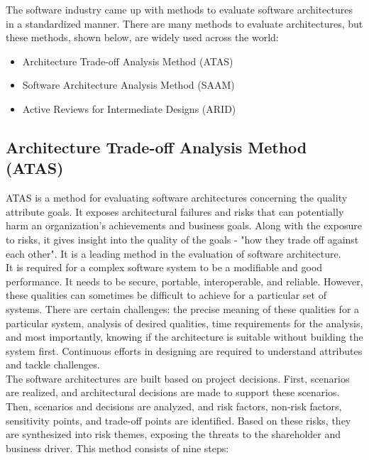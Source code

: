 \documentclass[12pt,a4paper]{article}
\begin{document}
{The software industry came up with methods to evaluate software architectures in a standardized manner. There are many methods to evaluate architectures, but these methods, shown below, are widely used across the world:

\begin{itemize}
\item Architecture Trade-off Analysis Method (ATAS)
\item Software Architecture Analysis Method (SAAM)
\item Active Reviews for Intermediate Designs (ARID)
\end{itemize}

\subsection{Architecture Trade-off Analysis Method (ATAS)}

ATAS is a method for evaluating software architectures concerning the quality attribute goals. It exposes architectural failures and risks that can potentially harm an organization's achievements and business goals. Along with the exposure to risks, it gives insight into the quality of the goals - "how they trade off against each other". It is a leading method in the evaluation of software architecture. \cite{r39} \\

It is required for a complex software system to be a modifiable and good performance. It needs to be secure, portable, interoperable, and reliable. However, these qualities can sometimes be difficult to achieve for a particular set of systems. There are certain challenges: the precise meaning of these qualities for a particular system, analysis of desired qualities, time requirements for the analysis, and most importantly, knowing if the architecture is suitable without building the system first. Continuous efforts in designing are required to understand attributes and tackle challenges. \cite{r39} \\

The software architectures are built based on project decisions. First, scenarios are realized, and architectural decisions are made to support these scenarios. Then, scenarios and decisions are analyzed, and risk factors, non-risk factors, sensitivity points, and trade-off points are identified. Based on these risks, they are synthesized into risk themes, exposing the threats to the shareholder and business driver. This method consists of nine steps: \cite{r39} 

}
\end{document}
